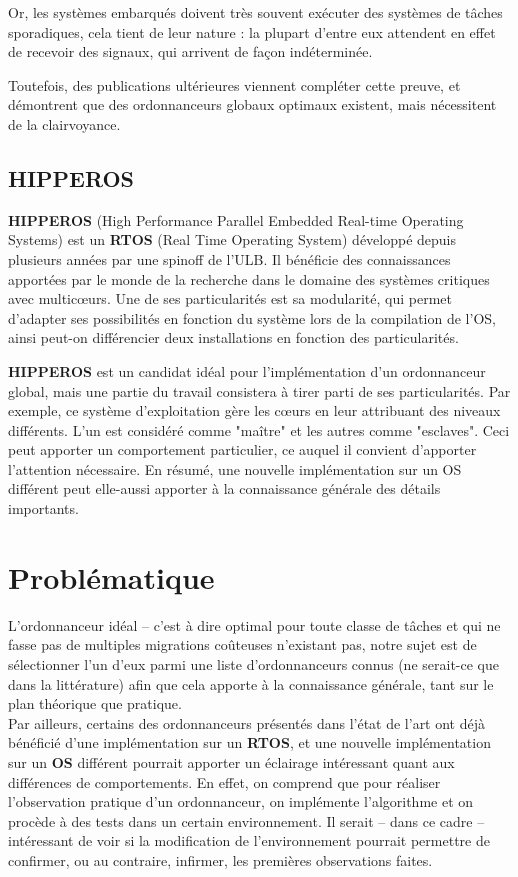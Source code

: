 \documentclass[11pt,a4paper,oneside]{report}
\begin{document}
Or, les systèmes embarqués doivent très souvent exécuter des systèmes de tâches sporadiques, 
cela tient de leur nature : la plupart d'entre eux attendent en effet de recevoir des 
signaux, qui arrivent de façon indéterminée.

Toutefois, des publications ultérieures viennent compléter cette preuve, et démontrent 
que des ordonnanceurs globaux optimaux existent, mais nécessitent de la clairvoyance.




\subsection{HIPPEROS}
\textbf{HIPPEROS} (High Performance Parallel Embedded Real-time Operating Systems)
est un \textbf{RTOS} (Real Time Operating System) développé depuis plusieurs années par une spinoff de l'ULB.
Il bénéficie des connaissances apportées par le monde de la recherche dans 
le domaine des systèmes critiques avec multic\oe{}urs. Une de ses particularités 
est sa modularité, qui permet d'adapter ses possibilités en fonction du système 
lors de la compilation de l'OS, ainsi peut-on différencier deux installations 
en fonction des particularités.

\textbf{HIPPEROS} est un candidat idéal pour l'implémentation d'un ordonnanceur 
global, mais une partie du travail consistera à tirer parti de ses particularités. 
Par exemple, ce système d'exploitation gère les c\oe{}urs en leur attribuant des 
niveaux différents. L'un est considéré comme "maître" et les autres comme "esclaves". 
Ceci peut apporter un comportement particulier, ce auquel il convient d'apporter 
l'attention nécessaire. En résumé, une nouvelle implémentation sur un OS différent 
peut elle-aussi apporter à la connaissance générale des détails importants.


\section{Problématique}
L'ordonnanceur idéal -- c'est à dire optimal pour toute classe de tâches et 
qui ne fasse pas de multiples migrations coûteuses n'existant pas, 
notre sujet est de sélectionner l'un d'eux parmi une liste 
d'ordonnanceurs connus (ne serait-ce que dans la littérature) afin que cela apporte 
à la connaissance générale, tant sur le plan théorique que pratique.\\

Par ailleurs, certains des ordonnanceurs présentés dans l'état de l'art 
 ont déjà bénéficié d'une implémentation sur un \textbf{RTOS}, et une nouvelle 
 implémentation sur un \textbf{OS} différent pourrait apporter un éclairage intéressant quant 
 aux différences de comportements.
 En effet, on comprend que pour réaliser l'observation pratique d'un ordonnanceur, 
 on implémente l'algorithme et on procède à des tests dans un certain environnement. 
 Il serait -- dans ce cadre -- intéressant de voir si la modification de l'environnement 
 pourrait permettre de confirmer, ou au contraire, infirmer, les premières observations faites.
\end{document}
